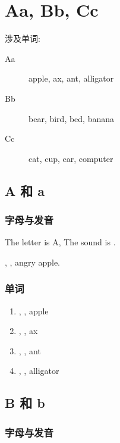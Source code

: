 \chapter{Aa, Bb, Cc}

\noindent 涉及单词:

\begin{description}
  \item[Aa] apple, ax, ant, alligator
  \item[Bb] bear, bird, bed, banana  
  \item[Cc] cat, cup, car, computer 
\end{description}

\section{A 和 a}

\subsection{字母与发音}

The letter is A, The sound is \jkipa{\ae}.

\jkipa{\ae}, \jkipa{\ae}, angry apple.


\subsection{单词}

\begin{enumerate}
  \item \jkipa{\ae}, \jkipa{\ae}, apple
  \item \jkipa{\ae}, \jkipa{\ae}, ax
  \item \jkipa{\ae}, \jkipa{\ae}, ant
  \item \jkipa{\ae}, \jkipa{\ae}, alligator
\end{enumerate}




\section{B 和 b}

\subsection{字母与发音}

